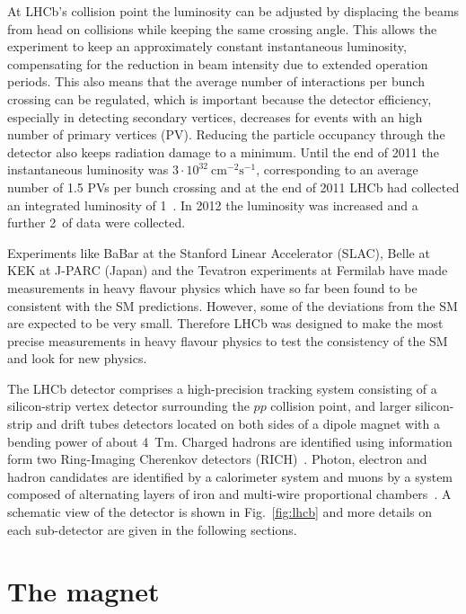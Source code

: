 At LHCb's collision point the luminosity can be adjusted by displacing the beams from head on collisions
while keeping the same crossing angle. This allows the experiment to keep an approximately constant instantaneous
luminosity, compensating for the reduction in beam intensity due to extended operation periods. This also means that
the average number of interactions per bunch crossing can be regulated, which is important
because the detector efficiency, especially in detecting secondary vertices, decreases for events with an high number
of primary vertices (PV). Reducing the particle occupancy through the detector also keeps radiation damage to a minimum. 
Until the end of 2011 the instantaneous luminosity was $3 \cdot 10^{32}~\mbox{cm}^{-2}\mbox{s}^{-1}$, corresponding 
to an average number of 1.5 PVs per bunch crossing and at the end of 2011 LHCb had collected an integrated
luminosity of 1~\invfb. In 2012 the luminosity was increased and a further 2~\invfb of data were collected.

Experiments like BaBar at the Stanford Linear Accelerator (SLAC), Belle at KEK at J-PARC (Japan)
and the Tevatron experiments at Fermilab have made measurements in heavy flavour physics
which have so far been found to be consistent with the SM predictions. However, some of the deviations from the
SM are expected to be very small. Therefore LHCb was designed to make the most precise measurements
in heavy flavour physics to test the consistency of the SM and look for new physics.

The LHCb detector comprises a high-precision tracking system consisting of a silicon-strip
vertex detector surrounding the $pp$ collision point, and larger silicon-strip and drift tubes detectors located
on both sides of a dipole magnet with a bending power of about 4~Tm.
Charged hadrons are identified using information form two
Ring-Imaging Cherenkov detectors (RICH)~\cite{LHCb-DP-2012-003}. Photon, electron and hadron candidates are
identified by a calorimeter system and muons by a system composed of alternating layers of iron
and multi-wire proportional chambers~\cite{LHCb-DP-2012-002}. A schematic view of the detector is shown in Fig.~\ref{fig:lhcb}
and more details on each sub-detector are given in the following sections.

\section{The magnet}

